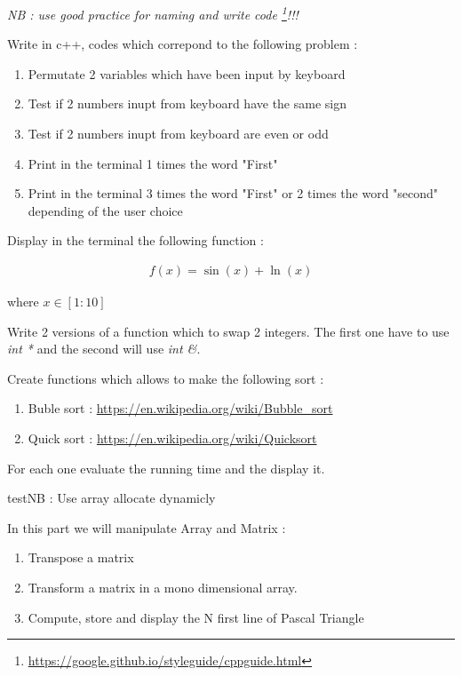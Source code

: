 \documentclass[12pt]{tdtp}
\begin{document}
\titre
\textit{NB : use good practice for naming and write code \footnote{\url{https://google.github.io/styleguide/cppguide.html}}!!!}

\Exo


Write in c++, codes which correpond to the following problem :

\begin{enumerate}
	\item Permutate 2 variables which have been input by keyboard
	\item Test if 2 numbers inupt from keyboard have the same sign
	\item Test if 2 numbers inupt from keyboard are even or odd
	\item Print in the terminal 1 times the word "First"
	\item Print in the terminal 3 times the word "First" or 2 times the word "second" depending of the user choice
\end{enumerate}

\Exo


Display in the terminal the following function :

\begin{eqnarray}
	f(x) = \sin(x) + \ln(x)
\end{eqnarray}

where $x \in [1:10]$

\Exo 

Write 2 versions of a function which to swap 2 integers. The first one have to use \textit{int *} and the second will use \textit{int \&}. 
\Exo


Create functions which allows to make the following sort :

\begin{enumerate}
	\item Buble sort : \url{https://en.wikipedia.org/wiki/Bubble_sort}
	\item Quick sort : \url{https://en.wikipedia.org/wiki/Quicksort}	
\end{enumerate}

For each one evaluate the running time and the display it.


test{NB : Use array allocate dynamicly}

\Exo

In this part we will manipulate Array and Matrix :
\begin{enumerate}
	\item Transpose a matrix
	\item Transform a matrix in a mono dimensional array.
	\item Compute, store and display the N first line of Pascal Triangle	
\end{enumerate}

\end{document}
